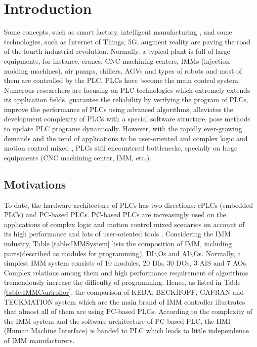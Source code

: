 \documentclass[journal,UTF8]{IEEEtran}
\begin{document}
\section{Introduction}
Some concepts, such as smart factory, intelligent manufacturing \cite{Gonzalez2017Supervisory,Chekired2018Industrial}, and some technologies, such as Internet of Things, 5G, augment reality \cite{Li2018Energy,Ling20185G} are paving the road of the fourth industrial revolution. Normally, a typical plant is full of large equipments, for instance, cranes, CNC machining centers, IMMs (injection molding machines), air pumps, chillers, AGVs and types of robots and most of them are controlled by the PLC. PLCs have become the main control system. Numerous researchers are focusing on PLC technologies which extremely extends its application fields. \cite{Jiang2013System,Jiang2013Bayesian,Adiego2015Applying} guarantee the reliability by verifying the program of PLCs, \cite{Gerk2006Advanced,Chang2007Adaptive,Dominic2016PLC} improve the performance of PLCs using advanced algorithms, \cite{WuA} alleviates the development complexity of PLCs with a special software structure, \cite{Sch2013Development,Morenas2017Shop} pose methods to update PLC programs dynamically.
However, with the rapidly ever-growing demands and the tend of applications to be user-oriented and complex logic and motion control mixed \cite{Zaeh2005A,Hossain2014Advanced}, PLCs still encountered bottlenecks, specially on large equipments (CNC machining center, IMM, etc.).

\subsection{Motivations}
To date, the hardware architecture of PLCs has two directions: ePLCs (embedded PLCs) and PC-based PLCs. PC-based PLCs are increasingly used on the applications of complex logic and motion control mixed scenarios on account of its high performance and lots of user-oriented tools \cite{Hossain2014Advanced}. Considering the IMM industry, Table \ref{table:IMMSystem} lists the composition of IMM, including parts(described as modules for programming), DI$\backslash$Os and AI$\backslash$Os. Normally, a simplest IMM system consists of 10 modules, 20 DIs, 30 DOs, 3 AIS and 7 AOs. Complex relations among them and high performance requirement of algorithms tremendously increase the difficulty of programming. Hence, as listed in Table \ref{table:IMMControllor}, the comparison of KEBA, BECKHOFF, GAFRAN and TECKMATION system which are the main brand of IMM controller illustrates that almost all of them are using PC-based PLCs. According to the complexity of the IMM system and the software architecture of PC-based PLC, the HMI (Human Machine Interface) is banded to PLC which leads to little independence of IMM manufacturers. 
\end{document}

